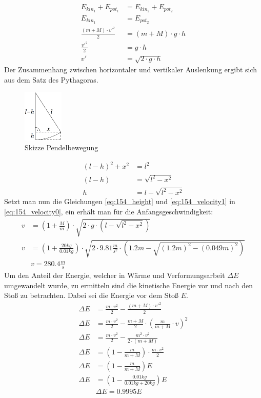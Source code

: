 \begin{align}
    E_{kin_1}+E_{pot_1}&=E_{kin_2}+E_{pot_2}		\nonumber\\
    E_{kin_1}&=E_{pot_2}							\nonumber\\
    \frac{(m+M)\cdot v'^2}{2}&=(m+M)\cdot g\cdot h	\nonumber\\
    \frac{v'^2}{2}&=g\cdot h						\nonumber\\
    v'&=\sqrt{2\cdot g\cdot h}						\label{eq:154_velocity1}
\end{align}
Der Zusammenhang zwischen horizontaler und vertikaler Auslenkung ergibt sich aus dem Satz des Pythagoras.
\begin{figure}[h]
    \centering
    \includegraphics[height=2.5cm]{images/154_1.png}
    \caption{Skizze Pendelbewegung}
\end{figure}
\begin{align}
    (l-h)^2+x^2&=l^2		\nonumber\\
    (l-h)&=\sqrt{l^2-x^2}	\nonumber\\
    h&=l-\sqrt{l^2-x^2}		\label{eq:154_height}
\end{align}
Setzt man nun die Gleichungen \eqref{eq:154_height} und \eqref{eq:154_velocity1} in \eqref{eq:154_velocity0}, ein erhält man für die Anfangsgeschwindigkeit:
\begin{align*}
    v&=\left(1+\frac{M}{m}\right)\cdot\sqrt{2\cdot g\cdot\left(l-\sqrt{l^2-x^2}\right)}\\
    v&=\left(1+\frac{20kg}{0.01kg}\right)\cdot\sqrt{2\cdot 9.81\frac{m}{s^2}\cdot\left(1.2m-\sqrt{(1.2m)^2-(0.049m)^2}\right)}\\
    &\boxed{v=280.4\frac{m}{s}}		\tag{a} \label{eq:154_a}
\end{align*}
Um den Anteil der Energie, welcher in Wärme und Verformungsarbeit $\Delta E$ umgewandelt wurde, zu ermitteln sind die kinetische Energie vor und nach den Stoß zu betrachten. Dabei sei die Energie vor dem Stoß $E$.
\begin{align*}
    \Delta E&=\frac{m\cdot v^2}{2}-\frac{(m+M)\cdot v'^2}{2}\\
    \Delta E&=\frac{m\cdot v^2}{2}-\frac{m+M}{2}\cdot \left(\frac{m}{m+M}\cdot v\right)^2\\
    \Delta E&=\frac{m\cdot v^2}{2}-\frac{m^2\cdot v^2}{2\cdot(m+M)}\\
    \Delta E&=\left(1-\frac{m}{m+M}\right)\cdot\frac{m\cdot v^2}{2}\\
    \Delta E&=\left(1-\frac{m}{m+M}\right)E\\
    \Delta E&=\left(1-\frac{0.01kg}{0.01kg+20kg}\right)E\\
    &\boxed{\Delta E=0.9995E}		\tag{b}	\label{eq:154_b}
\end{align*}